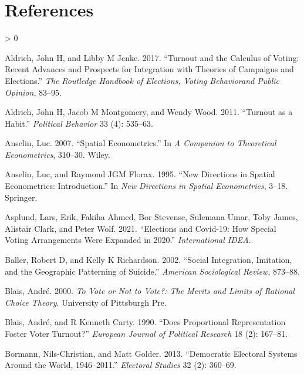 \documentclass[
  12pt,
]{article}
\newlength{\cslhangindent}
\newenvironment{CSLReferences}[2] %
 {%
  \setlength{\parindent}{0pt}
  \ifodd #1 \everypar{\setlength{\hangindent}{\cslhangindent}}\ignorespaces\fi
  \ifnum #2 > 0
  \setlength{\parskip}{#2\baselineskip}
  \fi
 }%
 {}
\begin{document}
\newpage

\hypertarget{references}{%
\section{References}\label{references}}

\hypertarget{refs}{}
\begin{CSLReferences}{1}{0}
\leavevmode\hypertarget{ref-aldrich2017turnout}{}%
Aldrich, John H, and Libby M Jenke. 2017. {``Turnout and the Calculus of
Voting: Recent Advances and Prospects for Integration with Theories of
Campaigns and Elections.''} \emph{The Routledge Handbook of Elections,
Voting Behaviorand Public Opinion}, 83--95.

\leavevmode\hypertarget{ref-aldrich2011turnout}{}%
Aldrich, John H, Jacob M Montgomery, and Wendy Wood. 2011. {``Turnout as
a Habit.''} \emph{Political Behavior} 33 (4): 535--63.

\leavevmode\hypertarget{ref-anselin2007spatial}{}%
Anselin, Luc. 2007. {``Spatial Econometrics.''} In \emph{A Companion to
Theoretical Econometrics}, 310--30. Wiley.

\leavevmode\hypertarget{ref-anselin1995new}{}%
Anselin, Luc, and Raymond JGM Florax. 1995. {``New Directions in Spatial
Econometrics: Introduction.''} In \emph{New Directions in Spatial
Econometrics}, 3--18. Springer.

\leavevmode\hypertarget{ref-asplund2021elections}{}%
Asplund, Lars, Erik, Fakiha Ahmed, Bor Stevense, Sulemana Umar, Toby
James, Alistair Clark, and Peter Wolf. 2021. {``Elections and Covid-19:
How Special Voting Arrangements Were Expanded in 2020.''}
\emph{International IDEA}.

\leavevmode\hypertarget{ref-baller2002social}{}%
Baller, Robert D, and Kelly K Richardson. 2002. {``Social Integration,
Imitation, and the Geographic Patterning of Suicide.''} \emph{American
Sociological Review}, 873--88.

\leavevmode\hypertarget{ref-blais2000vote}{}%
Blais, André. 2000. \emph{To Vote or Not to Vote?: The Merits and Limits
of Rational Choice Theory}. University of Pittsburgh Pre.

\leavevmode\hypertarget{ref-blais1990does}{}%
Blais, André, and R Kenneth Carty. 1990. {``Does Proportional
Representation Foster Voter Turnout?''} \emph{European Journal of
Political Research} 18 (2): 167--81.

\leavevmode\hypertarget{ref-bormann2013democratic}{}%
Bormann, Nils-Christian, and Matt Golder. 2013. {``Democratic Electoral
Systems Around the World, 1946--2011.''} \emph{Electoral Studies} 32
(2): 360--69.


\end{CSLReferences}
\end{document}
